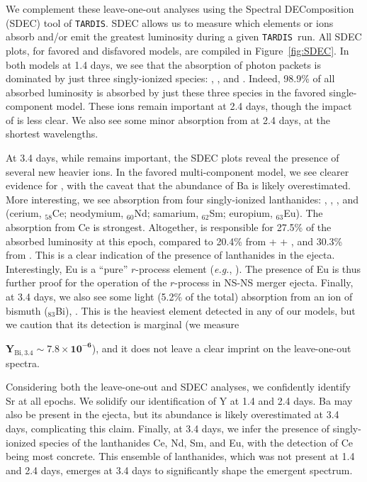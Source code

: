 \documentclass[twocolumn,twocolappendix]{aastex63}
\def\TARDIS{\texttt{TARDIS}}
\begin{document}
We complement these leave-one-out analyses using the Spectral DEComposition (SDEC) tool of \TARDIS. SDEC allows us to measure which elements or ions absorb and/or emit the greatest luminosity during a given \TARDIS~run. All SDEC plots, for favored and disfavored models, are compiled in Figure~\ref{fig:SDEC}. In both models at 1.4 days, we see that the absorption of photon packets is dominated by just three singly-ionized species: , , and . Indeed, 98.9\% of all absorbed luminosity is absorbed by just these three species in the favored single-component model. These ions remain important at 2.4 days, though the impact of  is less clear. We also see some minor absorption from  at 2.4 days, at the shortest wavelengths.

At 3.4 days, while  remains important, the SDEC plots reveal the presence of several new heavier ions. In the favored multi-component model, we see clearer evidence for , with the caveat that the abundance of Ba is likely overestimated. More interesting, we see absorption from four singly-ionized lanthanides: , , , and  (cerium, ${}_{58}$Ce; neodymium, ${}_{60}$Nd; samarium, ${}_{62}$Sm; europium, ${}_{63}$Eu). The absorption from Ce is strongest. Altogether,  is responsible for 27.5\% of the absorbed luminosity at this epoch, compared to 20.4\% from  +  + , and 30.3\% from . This is a clear indication of the presence of lanthanides in the ejecta. Interestingly, Eu is a ``pure'' $r$-process element (\textit{e.g.}, \citealt{bisterzo14}). The presence of Eu is thus further proof for the operation of the $r$-process in NS-NS merger ejecta. Finally, at 3.4 days, we also see some light (5.2\% of the total) absorption from an ion of bismuth (${}_{83}$Bi), . This is the heaviest element detected in any of our models, but we caution that its detection is marginal (we measure {$\mathbf{Y_{\mathrm{Bi},3.4} \sim 7.8 \times 10^{-6}}$), and it does not leave a clear imprint on the leave-one-out spectra.  

Considering both the leave-one-out and SDEC analyses, we confidently identify Sr at all epochs. We solidify our identification of Y at 1.4 and 2.4 days. Ba may also be present in the ejecta, but its abundance is likely overestimated at 3.4 days, complicating this claim. Finally, at 3.4 days, we infer the presence of singly-ionized species of the lanthanides Ce, Nd, Sm, and Eu, with the detection of Ce being most concrete. This ensemble of lanthanides, which was not present at 1.4 and 2.4 days, emerges at 3.4 days to significantly shape the emergent spectrum. 




}
\end{document}
